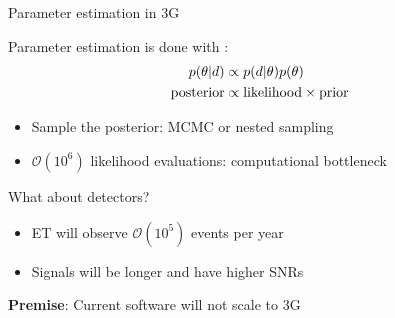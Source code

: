\documentclass[usenames,dvipsnames,t]{beamer}
\begin{document}
\begin{frame}{Parameter estimation in 3G}
  \def\x{3mm}
  \def\y{5mm}

  Parameter estimation is done with :
  \begin{align*}
    p(\theta|d) &\propto p(d|\theta) p(\theta) \\
    \rm{posterior} &\propto \rm{likelihood} \times \rm{prior}
  \end{align*}

  \begin{itemize}
    \item Sample the posterior: MCMC or nested sampling

    \item $\mathcal{O}(10^6)$ likelihood evaluations: computational bottleneck
  \end{itemize}
  
  \pause
  \vspace{\y}
  
  What about  detectors?
  \begin{itemize}
    \item ET will observe $\mathcal{O}(10^5)$ events per year
    
    \item Signals will be longer and have higher SNRs
  \end{itemize}

  \pause
  \vspace{\y}

  \begin{tcolorbox}[colback=blue!10, boxrule=0pt]
    \textbf{Premise}: Current software will not scale to 3G~\cite{Hu:2024mvn}
  \end{tcolorbox}

\end{frame}




\end{document}
